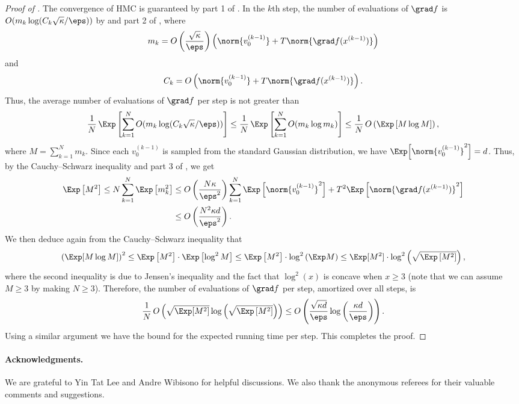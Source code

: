 \begin{proof}[Proof of ]
	The convergence of HMC is guaranteed by part 1 of . In the $k$th step, the number of evaluations of $\grad f$ is $O(m_k \log (C_k \sqrt{\kappa}/\eps))$ by  and part 2 of , where
	\[
	m_k = O\left( \frac{\sqrt{\kappa}}{\eps}\right) \left( \norm{v_0^{(k-1)}} + T\norm{\grad f(x^{(k-1)})}  \right) 
	\]
	and
	\[
	C_k = O\left( \norm{v_0^{(k-1)}} + T\norm{\grad f(x^{(k-1)})} \right).
	\]
Thus, the average number of evaluations of $\grad f$ per step is
%
not greater than  %
	\[
	\frac{1}{N}\, \Exp \left[ \sum_{k=1}^N O(m_k \log (C_k \sqrt{\kappa}/\eps)) \right] \le \frac{1}{N}\, \Exp \left[ \sum_{k=1}^N O(m_k \log m_k) \right]
	\le \frac{1}{N} \, O\left( \Exp \left[ M \log M \right] \right),
	\]
	where $M = \sum_{k=1}^N m_k$. Since each $v_0^{(k-1)}$ is sampled from the standard Gaussian distribution, we have $\Exp \Big[ \norm{v_0^{(k-1)}}^2 \Big] = d$. Thus, by the Cauchy--Schwarz inequality and part 3 of , we get
	\begin{align*}
		\Exp\left[ M^2 \right] \le N \sum_{k=1}^N \Exp\left[ m_k^2 \right] 
		&\le O\left( \frac{N\kappa}{\eps^2} \right) \sum_{k=1}^N \Exp\left[ \norm{v_0^{(k-1)}}^2 \right] + T^2 \Exp\left[ \norm{\grad f(x^{(k-1)})}^2 \right]\\ 
		&\le O\left( \frac{N^2\kappa d}{\eps^2} \right).
	\end{align*}
	We then deduce again from the Cauchy--Schwarz inequality that
	\[
	\left(\Exp[M \log M]\right)^2 \le \Exp\left[M^2\right] \cdot \Exp\left[\log^2 M\right] \le \Exp\left[ M^2 \right] \cdot \log^2\left( \Exp M \right) 
	\le \Exp[M^2] \cdot \log^2\left( \sqrt{\Exp\left[ M^2 \right]} \right), 
	\]
	where the second inequality is due to Jensen's inequality and the fact that $\log^2(x)$ is concave when $x \geq 3$ (note that we can assume $M \ge 3$ by making $N \ge 3$). 
	Therefore, the number of evaluations of $\grad f$ per step, amortized over all steps, is 
	\[
	\frac{1}{N}\, O\left( \sqrt{\Exp[M^2]}  \log\left( \sqrt{\Exp\left[ M^2 \right]} \right) \right) \le O\left( \frac{\sqrt{\kappa d}}{\eps} \log\left( \frac{\kappa d}{\eps} \right) \right).
	\]
	Using a similar argument we have the bound for the expected running time per step. This completes the proof.
\end{proof}

\paragraph{Acknowledgments.} We are grateful to Yin Tat Lee and Andre Wibisono for helpful discussions. 
We also thank the anonymous referees for their valuable comments and suggestions. 












